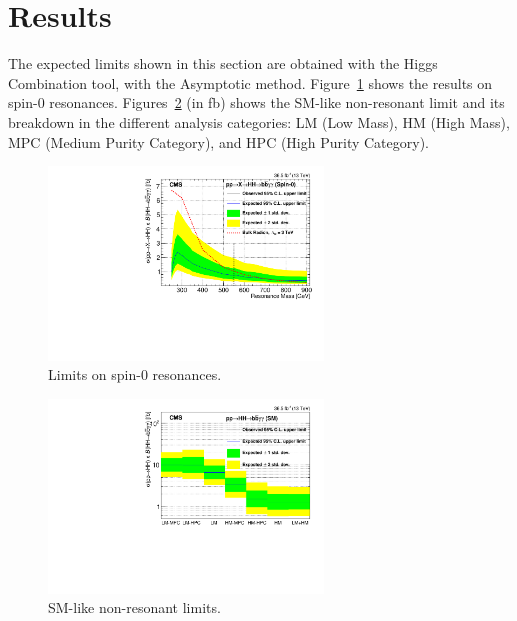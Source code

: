 \section{Results}
\label{sec:results}



The expected limits shown in this section are obtained with the Higgs Combination tool, with the Asymptotic method. 
Figure~\ref{fig:result_radion} shows the results on spin-0 resonances.
Figures~\ref{fig:nonres} (in fb) shows the
SM-like non-resonant limit and its breakdown in the different analysis
categories: LM (Low Mass), HM (High Mass), MPC (Medium Purity
Category), and HPC (High Purity Category). 

\begin{figure}[h]
  \centering
  \includegraphics[width=0.65\textwidth]{figures/sec-results/LimsRadionLMHM.pdf}\hfil
  \caption{Limits on spin-0 resonances.}
  \label{fig:result_radion}
\end{figure}

\begin{figure}[h]
  \centering
  \includegraphics[width=0.65\textwidth]{figures/sec-results/NonResSMCats.pdf}\hfil
  \caption{SM-like non-resonant limits.}
  \label{fig:nonres}
\end{figure}

